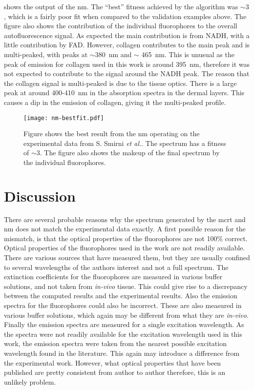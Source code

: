  shows the output of the \gls*{nm}.
The ``best'' fitness achieved by the algorithm was $\sim3$, which is a fairly poor fit when compared to the validation examples above.
The figure also shows the contribution of the individual fluorophores to the overall autofluorescence signal.
As expected the main contribution is from NADH, with a little contribution by FAD.
However, collagen contributes to the main peak and is multi-peaked, with peaks at $\sim$380~nm and $\sim$ 465~nm.
This is unusual as the peak of emission for collagen used in this work is around 395~nm, therefore it was not expected to contribute to the signal around the NADH peak.
The reason that the collagen signal is multi-peaked is due to the tissue optics.
There is a large peak at around 400-410~nm in the absorption spectra in the dermal layers.
This causes a dip in the emission of collagen, giving it the multi-peaked profile.

\begin{figure}[!htpb]
  \centering
  \texttt{[image: nm-bestfit.pdf]}
  \caption{Figure shows the best result from the \gls*{nm} operating on the experimental data from S. Smirni \textit{et al.}. The spectrum has a fitness of $\sim 3$. The figure also shows the makeup of the final spectrum by the individual fluorophores.}
  \label{fig:bestNMresult}
\end{figure}

\section{Discussion}

There are several probable reasons why the spectrum generated by the \gls*{mcrt} and \gls*{nm} does not match the experimental data exactly.
A first possible reason for the mismatch, is that the optical properties of the fluorophores are not 100\% correct.
Optical properties of the fluorophores used in the work are not readily available.
There are various sources that have measured them, but they are usually confined to several wavelengths of the authors interest and not a full spectrum.
The extinction coefficients for the fluorophores are measured in various buffer solutions, and not taken from \textit{in-vivo} tissue.
This could give rise to a discrepancy between the computed results and the experimental results.
Also the emission spectra for the fluorophores could also be incorrect.
These are also measured in various buffer solutions, which again may be different from what they are \textit{in-vivo}.
Finally the emission spectra are measured for a single excitation wavelength.
As the spectra were not readily available for the excitation wavelength used in this work, the emission spectra were taken from the nearest possible excitation wavelength found in the literature. This again may introduce a difference from the experimental work.
However, what optical properties that have been published are pretty consistent from author to author therefore, this is an unlikely problem.


